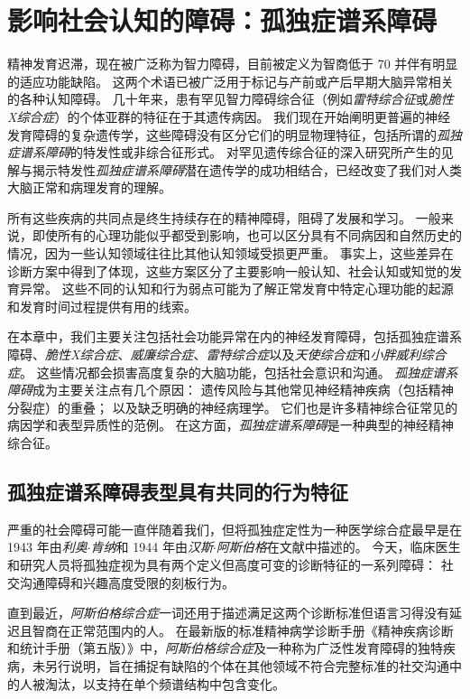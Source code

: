 \chapter{影响社会认知的障碍：孤独症谱系障碍} \label{chap:chap62}

精神发育迟滞，现在被广泛称为智力障碍，目前被定义为智商低于 70 并伴有明显的适应功能缺陷。
这两个术语已被广泛用于标记与产前或产后早期大脑异常相关的各种认知障碍。
几十年来，患有罕见智力障碍综合征（例如\textit{雷特综合征}或\textit{脆性X综合症}）的个体亚群的特征在于其遗传病因。
我们现在开始阐明更普遍的神经发育障碍的复杂遗传学，这些障碍没有区分它们的明显物理特征，包括所谓的\textit{孤独症谱系障碍}的特发性或非综合征形式。
对罕见遗传综合征的深入研究所产生的见解与揭示特发性\textit{孤独症谱系障碍}潜在遗传学的成功相结合，已经改变了我们对人类大脑正常和病理发育的理解。


所有这些疾病的共同点是终生持续存在的精神障碍，阻碍了发展和学习。
一般来说，即使所有的心理功能似乎都受到影响，也可以区分具有不同病因和自然历史的情况，因为一些认知领域往往比其他认知领域受损更严重。
事实上，这些差异在诊断方案中得到了体现，这些方案区分了主要影响一般认知、社会认知或知觉的发育异常。
这些不同的认知和行为弱点可能为了解正常发育中特定心理功能的起源和发育时间过程提供有用的线索。


在本章中，我们主要关注包括社会功能异常在内的神经发育障碍，包括孤独症谱系障碍、\textit{脆性X综合症}、\textit{威廉综合症}、\textit{雷特综合症}以及\textit{天使综合症}和\textit{小胖威利综合症}。
这些情况都会损害高度复杂的大脑功能，包括社会意识和沟通。
\textit{孤独症谱系障碍}成为主要关注点有几个原因：
遗传风险与其他常见神经精神疾病（包括精神分裂症）的重叠；
以及缺乏明确的神经病理学。
它们也是许多精神综合征常见的病因学和表型异质性的范例。
在这方面，\textit{孤独症谱系障碍}是一种典型的神经精神综合征。



\section{孤独症谱系障碍表型具有共同的行为特征}

严重的社会障碍可能一直伴随着我们，但将孤独症定性为一种医学综合症最早是在 1943 年由\textit{利奥$\cdot$肯纳}和 1944 年由\textit{汉斯$\cdot$阿斯伯格}在文献中描述的。
今天，临床医生和研究人员将孤独症视为具有两个定义但高度可变的诊断特征的一系列障碍：
社交沟通障碍和兴趣高度受限的刻板行为。


直到最近，\textit{阿斯伯格综合症}一词还用于描述满足这两个诊断标准但语言习得没有延迟且智商在正常范围内的人。
在最新版的标准精神病学诊断手册《精神疾病诊断和统计手册（第五版）》中，\textit{阿斯伯格综合症}及一种称为广泛性发育障碍的独特疾病，未另行说明，旨在捕捉有缺陷的个体在其他领域不符合完整标准的社交沟通中的人被淘汰，以支持在单个频谱结构中包含变化。


